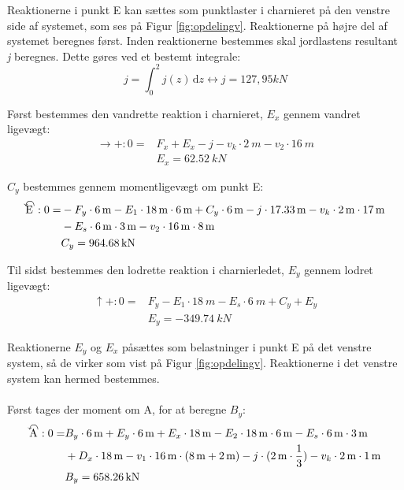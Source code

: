 Reaktionerne i punkt E kan sættes som punktlaster i charnieret på den venstre side af systemet, som ses på Figur \ref{fig:opdelingv}. Reaktionerne på højre del af systemet beregnes først.
\newline
\newline
Inden reaktionerne bestemmes skal jordlastens resultant \textit{j} beregnes. Dette gøres ved et bestemt integrale: 
\begin{equation}
	j = \int_{0}^{2} \! j(z) \, \mathrm{d}z \leftrightarrow j = 127,\!95 kN
\end{equation}

Først bestemmes den vandrette reaktion i charnieret, $E_x$ gennem vandret ligevægt: 
\begin{equation}
\begin{split}
	\rightarrow+: 0 = & F_x + E_x - j - v_k \cdot \SI{2}{m} - v_2 \cdot \SI{16}{m}
	\\ &
	E_x = \SI{62,52}{kN}
\end{split}
\end{equation}

$C_y$ bestemmes gennem momentligevægt om punkt E: 
\begin{equation}
\begin{split}
	\ALN{\text{E}} :0 = & -F_y \cdot \SI{6}{m} - E_1 \cdot \SI{18}{m} \cdot \SI{6}{m} + C_y \cdot \SI{6}{m} - j \cdot \SI{17,33}{m} - v_k \cdot \SI{2}{m} \cdot \SI{17}{m} \\ & - E_s \cdot \SI{6}{m} \cdot \SI{3}{m} - v_2 \cdot \SI{16}{m} \cdot \SI{8}{m}
	\\ &
	C_y = \SI{964,68}{kN}
\end{split}
\end{equation}

Til sidst bestemmes den lodrette reaktion i charnierledet, $E_y$ gennem lodret ligevægt: 
\begin{equation}
\begin{split}
	\uparrow+: 0 = & F_y - E_1 \cdot \SI{18}{m} - E_s \cdot \SI{6}{m} + C_y + E_y
	\\ &
	E_y = \SI{-349,74}{kN}
\end{split}
\end{equation}

Reaktionerne $E_y$ og $E_x$ påsættes som belastninger i punkt E på det venstre system, så de virker som vist på Figur \ref{fig:opdelingv}. Reaktionerne i det venstre system kan hermed bestemmes.
\\
\\
Først tages der moment om A, for at beregne $B_y$:
\begin{equation}
\begin{split}
	\ALN{\text{A}}: 0 = & B_y \cdot \SI{6}{m} + E_y \cdot \SI{6}{m} + E_x \cdot \SI{18}{m} - E_2 \cdot \SI{18}{m} \cdot \SI{6}{m} - E_s \cdot \SI{6}{m} \cdot \SI{3}{m} \\ & + D_x \cdot \SI{18}{m} - v_1 \cdot \SI{16}{m} \cdot (\SI{8}{m} + \SI{2}{m}) - j \cdot (\SI{2}{m} \cdot \frac{1}{3}) - v_k \cdot \SI{2}{m} \cdot \SI{1}{m}
	\\ &
	B_y = \SI{658,26}{kN}
\end{split}
\end{equation}

